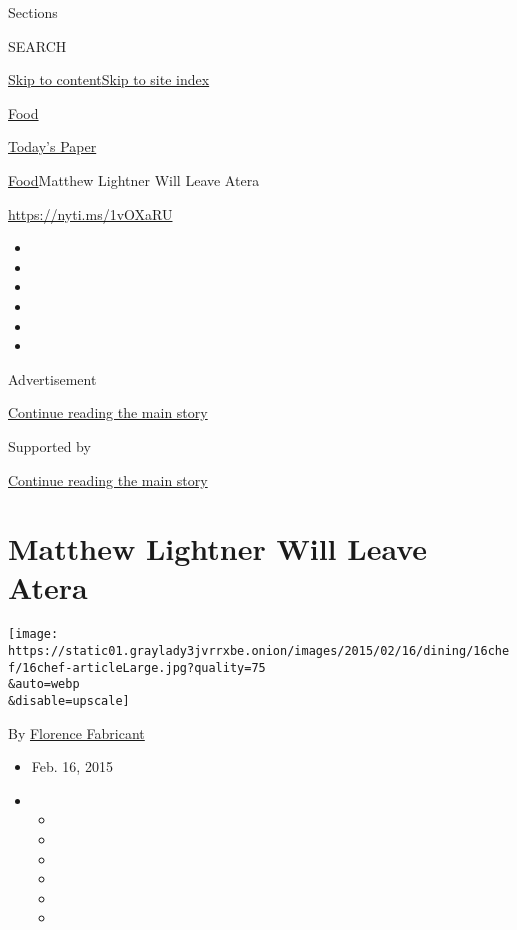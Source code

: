 Sections

SEARCH

\protect\hyperlink{site-content}{Skip to
content}\protect\hyperlink{site-index}{Skip to site index}

\href{https://www.nytimes3xbfgragh.onion/section/food}{Food}

\href{https://myaccount.nytimes3xbfgragh.onion/auth/login?response_type=cookie\&client_id=vi}{}

\href{https://www.nytimes3xbfgragh.onion/section/todayspaper}{Today's
Paper}

\href{/section/food}{Food}\textbar{}Matthew Lightner Will Leave Atera

\url{https://nyti.ms/1vOXaRU}

\begin{itemize}
\item
\item
\item
\item
\item
\item
\end{itemize}

Advertisement

\protect\hyperlink{after-top}{Continue reading the main story}

Supported by

\protect\hyperlink{after-sponsor}{Continue reading the main story}

\hypertarget{matthew-lightner-will-leave-atera}{%
\section{Matthew Lightner Will Leave
Atera}\label{matthew-lightner-will-leave-atera}}

\texttt{[image: https://static01.graylady3jvrrxbe.onion/images/2015/02/16/dining/16chef/16chef-articleLarge.jpg?quality=75\\\&auto=webp\\\&disable=upscale]}

By
\href{http://www.nytimes3xbfgragh.onion/by/florence-fabricant}{Florence
Fabricant}

\begin{itemize}
\item
  Feb. 16, 2015
\item
  \begin{itemize}
  \item
  \item
  \item
  \item
  \item
  \item
  \end{itemize}
\end{itemize}

